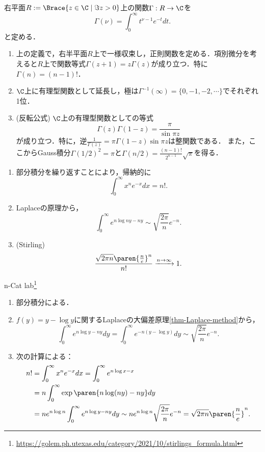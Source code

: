 \documentclass[uplatex,dvipdfmx]{jsreport}
\begin{document}
\begin{definition}
    右平面$R:=\Brace{z\in\C\mid\Im z>0}$上の関数$\Gamma:R\to\C$を
    \[\Gamma(\nu)=\int^\infty_0t^{\nu-1}e^{-t}dt.\]
    と定める．
\end{definition}

\begin{theorem}[有理型関数への延長と反転公式]\mbox{}
    \begin{enumerate}
        \item 上の定義で，右半平面$R$上で一様収束し，正則関数を定める．項別微分を考えると$R$上で関数等式$\Gamma(z+1)=z\Gamma(z)$が成り立つ．特に$\Gamma(n)=(n-1)!$．
        \item $\C$上に有理型関数として延長し，極は$\Gamma^{-1}(\infty)=\{0,-1,-2,\cdots\}$でそれぞれ1位．
        \item (反転公式) $\C$上の有理型関数としての等式
        \[\Gamma(z)\Gamma(1-z)=\frac{\pi}{\sin\pi z}\]
        が成り立つ．特に，逆$\frac{1}{\Gamma(z)}=\pi\Gamma(1-z)\sin\pi z$は整関数である．
        また，ここからGauss積分$\Gamma(1/2)^2=\pi$と$\Gamma(n/2)=\frac{(n-1)!}{2^{n-1}}\sqrt{\pi}$を得る．
    \end{enumerate}
\end{theorem}

\begin{theorem}\mbox{}
    \begin{enumerate}
        \item 部分積分を繰り返すことにより，帰納的に
        \[\int_0^\infty x^ne^{-x}dx=n!.\]
        \item Laplaceの原理から，
        \[\int^\infty_0e^{n\log ny-ny}\sim\sqrt{\frac{2\pi}{n}}e^{-n}.\]
        \item (Stirling)
        \[\frac{\sqrt{2\pi n}\paren{\frac{n}{e}}^n}{n!}\xrightarrow{n\to\infty}1.\]
    \end{enumerate}
\end{theorem}
\begin{Proof}n-Cat lab\footnote{\url{https://golem.ph.utexas.edu/category/2021/10/stirlings_formula.html}}\mbox{}
    \begin{enumerate}
        \item 部分積分による．
        \item $f(y)=y-\log y$に関するLaplaceの大偏差原理\ref{thm-Laplace-method}から，
        \[\int^\infty_0e^{n\log y-ny}dy=\int^\infty_0 e^{-n(y-\log y)}dy\sim\sqrt{\frac{2\pi}{n}}e^{-n}.\]
        \item 次の計算による：
        \begin{align*}
            n!&=\int_0^\infty x^ne^{-x}dx=\int^\infty_0e^{n\log x-x}\\
            &=n\int^\infty_0\exp\paren{n\log(ny)-ny}dy\\
            &=ne^{n\log n}\int^\infty_0e^{n\log y-ny}dy\sim ne^{n\log n}\sqrt{\frac{2\pi}{n}}e^{-n}=\sqrt{2\pi n}\paren{\frac{n}{e}}^n.
        \end{align*}
    \end{enumerate}
\end{Proof}
\end{document}
